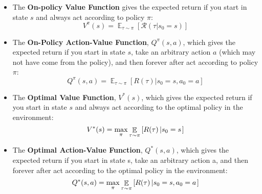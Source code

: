 \begin{itemize}
    \item The \textbf{On-policy Value Function} gives the expected return if you start in state $s$ and always act according to policy $\pi$:
    $$V^\pi(s) = \mathop{\mathbb E}_{\tau \sim \pi} \left[\mathcal{R}(\tau | s_0 = s)\right]$$
    \item The \textbf{On-Policy Action-Value Function}, $Q^{\pi}(s,a)$, which gives the expected return if you start in state $s$, take an arbitrary action $a$ (which may not have come from the policy), and then forever after act according to policy $\pi$:
    $$Q^{\pi}(s,a) = \mathop{\mathbb E}_{\tau \sim \pi}\left[R(\tau)\left| s_0 = s, a_0 = a\right.\right]$$
    \item The \textbf{Optimal Value Function}, $V^*(s)$, which gives the expected return if you start in state $s$ and always act according to the optimal policy in the environment:
    $$V^*(s) = \max_{\pi} \mathop{\mathbb{E}}\limits_{\tau \sim \pi}\left[R(\tau)\left| s_0 = s\right.\right]$$
    \item The \textbf{Optimal Action-Value Function}, $Q^*(s,a)$, which gives the expected return if you start in state s, take an arbitrary action a, and then forever after act according to the optimal policy in the environment:
    \begin{equation}
        Q^*(s,a) = \max_{\pi} \mathop{\mathbb{E}}\limits_{\tau \sim \pi}\left[R(\tau)\left| s_0 = s, a_0 = a\right.\right]
        \label{eq:q_optimal_value}
    \end{equation}


\end{itemize}




